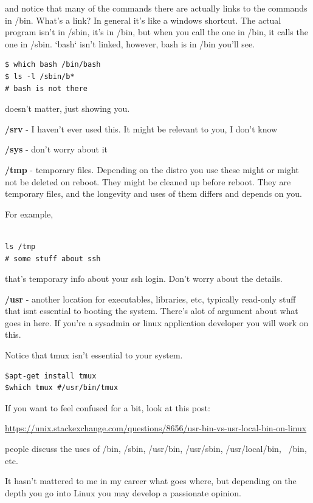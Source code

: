\documentclass[10pt]{article}
\begin{document}
 and notice that many of the commands there are actually links to the commands
in /bin. What's a link? In general it's like a windows shortcut. The actual
program isn't in /sbin, it's in /bin, but when you call the one in /bin, it
calls the one in /sbin. `bash` isn't linked, however, bash is in /bin you'll
see. 

\begin{lstlisting}
$ which bash /bin/bash
$ ls -l /sbin/b*
# bash is not there
\end{lstlisting}

doesn't matter, just showing you.

{\color{red} \textbf{/srv}} - I haven't ever used this. It might be relevant to
you, I don't know

{\color{red} \textbf{/sys}} - don't worry about it

{\color{red} \textbf{/tmp}} - temporary files. Depending on the distro you use
these might or might not be deleted on reboot. They might be cleaned up before
reboot. They are temporary files, and the longevity and uses of them differs and
depends on you.

For example, 

\begin{lstlisting}

ls /tmp
# some stuff about ssh
\end{lstlisting}

that's temporary info about your ssh login. Don't worry about the details. 

{\color{red} \textbf{/usr}} - another location for executables, libraries, etc,
typically read-only stuff that isnt essential to booting the system. There's
alot of argument about what goes in here. If you're a sysadmin or linux
application developer you will work on this.

Notice that tmux isn't essential to your system. 

\begin{lstlisting}
$apt-get install tmux 
$which tmux #/usr/bin/tmux
\end{lstlisting}

If you want to feel confused for a bit, look at this post:

\url{https://unix.stackexchange.com/questions/8656/usr-bin-vs-usr-local-bin-on-linux}

people discuss the uses of /bin, /sbin, /usr/bin, /usr/sbin, /usr/local/bin,
~/bin, etc.

It hasn't mattered to me in my career what goes where, but depending on the
depth you go into Linux you may develop a passionate opinion.
\end{document}
